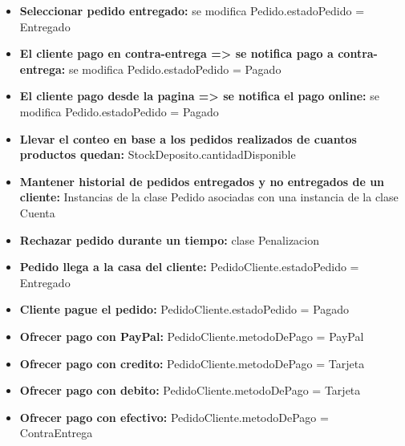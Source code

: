 \begin{itemize}
\item \textbf{Seleccionar pedido entregado:}   se modifica Pedido.estadoPedido = Entregado
\item \textbf{El cliente pago en contra-entrega => se notifica pago a contra-entrega:}    se modifica Pedido.estadoPedido = Pagado
\item \textbf{El cliente pago desde la pagina => se notifica el pago online:}  se modifica Pedido.estadoPedido = Pagado
\item \textbf{Llevar el conteo en base a los pedidos realizados de cuantos productos quedan:}  StockDeposito.cantidadDisponible
\item \textbf{Mantener historial de pedidos entregados y no entregados de un cliente:}  Instancias de la clase Pedido asociadas con una instancia de la clase Cuenta
\item \textbf{Rechazar pedido durante un tiempo:}  clase Penalizacion
\item \textbf{Pedido llega a la casa del cliente:}  PedidoCliente.estadoPedido = Entregado
\item \textbf{Cliente pague el pedido:}  PedidoCliente.estadoPedido = Pagado
\item \textbf{Ofrecer pago con PayPal:}  PedidoCliente.metodoDePago = PayPal
\item \textbf{Ofrecer pago con credito:}  PedidoCliente.metodoDePago = Tarjeta
\item \textbf{Ofrecer pago con debito:}  PedidoCliente.metodoDePago = Tarjeta
\item \textbf{Ofrecer pago con efectivo:}  PedidoCliente.metodoDePago = ContraEntrega
 
\end{itemize}

\newpage